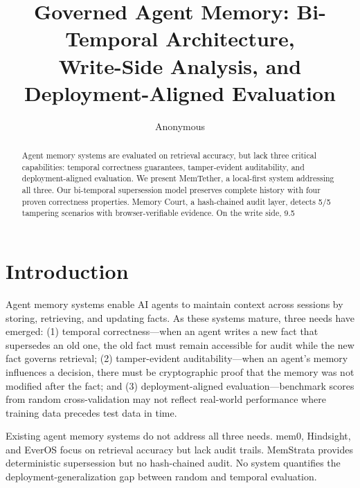 \documentclass[sigconf,nonacm]{acmart}
\title{Governed Agent Memory: Bi-Temporal Architecture,\\Write-Side Analysis, and Deployment-Aligned Evaluation}
\author{Anonymous}
\affiliation{\institution{Anonymous Institution}\city{Anonymous}\country{Anonymous}}
\begin{document}
\begin{abstract}
Agent memory systems are evaluated on retrieval accuracy, but lack three critical capabilities: temporal correctness guarantees, tamper-evident auditability, and deployment-aligned evaluation. We present MemTether, a local-first system addressing all three. Our bi-temporal supersession model preserves complete history with four proven correctness properties. Memory Court, a hash-chained audit layer, detects 5/5 tampering scenarios with browser-verifiable evidence. On the write side, 9.5%
\end{abstract}


\maketitle
\section{Introduction}
Agent memory systems enable AI agents to maintain context across sessions by storing, retrieving, and updating facts. As these systems mature, three needs have emerged: (1) temporal correctness---when an agent writes a new fact that supersedes an old one, the old fact must remain accessible for audit while the new fact governs retrieval; (2) tamper-evident auditability---when an agent's memory influences a decision, there must be cryptographic proof that the memory was not modified after the fact; and (3) deployment-aligned evaluation---benchmark scores from random cross-validation may not reflect real-world performance where training data precedes test data in time.

Existing agent memory systems do not address all three needs. mem0, Hindsight, and EverOS focus on retrieval accuracy but lack audit trails. MemStrata provides deterministic supersession but no hash-chained audit. No system quantifies the deployment-generalization gap between random and temporal evaluation.
\end{document}
